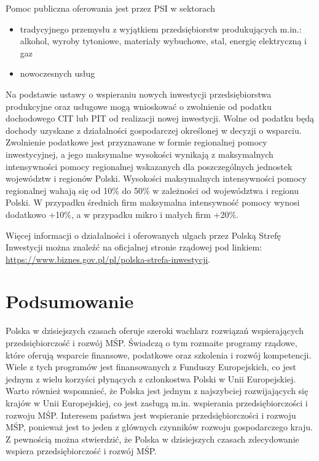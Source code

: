 \documentclass[11pt]{article}
\begin{document}
Pomoc publiczna oferowania jest przez PSI w sektorach
\begin{itemize}
  \item tradycyjnego przemysłu z wyjątkiem przedsiębiorstw produkujących m.in.: alkohol,
        wyroby tytoniowe, materiały wybuchowe, stal, energię elektryczną i gaz
  \item nowoczesnych usług
\end{itemize}

Na podstawie ustawy o wspieraniu nowych inwestycji przedsiębiorstwa produkcyjne oraz usługowe mogą wnioskować
o zwolnienie od podatku dochodowego CIT lub PIT od realizacji nowej inwestycji.
Wolne od podatku będą dochody uzyskane z działalności gospodarczej określonej w decyzji o wsparciu.
Zwolnienie podatkowe jest przyznawane w formie regionalnej pomocy inwestycyjnej, a jego maksymalne wysokości
wynikają z maksymalnych intensywności pomocy regionalnej wskazanych dla poszczególnych jednostek województw i regionów Polski.
Wysokości maksymalnych intensywności pomocy regionalnej wahają się od 10\% do 50\% w zależności od województwa i regionu Polski.
W przypadku średnich firm maksymalna intensywność pomocy wynosi dodatkowo +10\%, a w przypadku mikro i małych firm +20\%.

Więcej informacji o działalności i oferowanych ulgach przez Polską Strefę Inwestycji można
znaleźć na oficjalnej stronie rządowej pod linkiem: \url{https://www.biznes.gov.pl/pl/polska-strefa-inwestycji}.

\section*{Podsumowanie}

Polska w dzisiejszych czasach oferuje szeroki wachlarz rozwiązań wspierających przedsiębiorczość i rozwój MŚP.
Świadczą o tym rozmaite programy rządowe, które oferują wsparcie finansowe, podatkowe oraz szkolenia i rozwój kompetencji.
Wiele z tych programów jest finansowanych z Funduszy Europejskich, co jest jednym z wielu korzyści płynących z członkostwa Polski w Unii Europejskiej. 
Warto również wspomnieć, że Polska jest jednym z najszybciej rozwijających się krajów w Unii Europejskiej, co jest zasługą m.in.
wspierania przedsiębiorczości i rozwoju MŚP.
Interesem państwa jest wspieranie przedsiębiorczości i rozwoju MŚP, ponieważ jest to jeden z głównych czynników rozwoju gospodarczego kraju.
Z pewnością można stwierdzić, że Polska w dzisiejszych czasach zdecydowanie wspiera przedsiębiorczość i rozwój MŚP.

\pagebreak

{}

\end{document}

